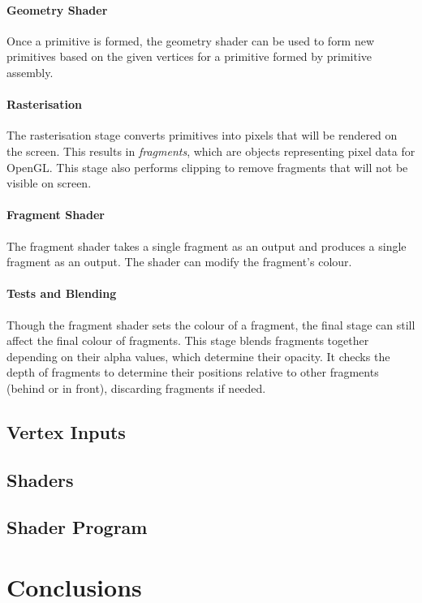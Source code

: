 \documentclass[a4paper, 12pt]{scrartcl}
\begin{document}
\paragraph{Geometry Shader}
Once a primitive is formed, the geometry shader can be used to form new primitives based on the given vertices for a primitive formed by primitive assembly.

\paragraph{Rasterisation}
The rasterisation stage converts primitives into pixels that will be rendered on the screen. This results in \textit{fragments}, which are objects representing pixel data for OpenGL. This stage also performs clipping to remove fragments that will not be visible on screen.

\paragraph{Fragment Shader}
The fragment shader takes a single fragment as an output and produces a single fragment as an output. The shader can modify the fragment's colour.

\paragraph{Tests and Blending}
Though the fragment shader sets the colour of a fragment, the final stage can still affect the final colour of fragments. This stage blends fragments together depending on their alpha values, which determine their opacity. It checks the depth of fragments to determine their positions relative to other fragments (behind or in front), discarding fragments if needed.

\subsection{Vertex Inputs}

\subsection{Shaders}

\subsection{Shader Program}

\section{Conclusions}
\end{document}
